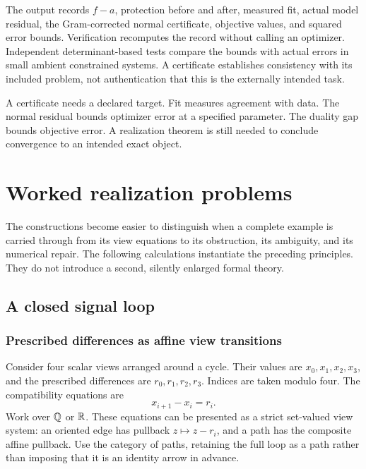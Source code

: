 The output records $f-a$, protection before and after, measured fit, actual model residual, the Gram-corrected normal certificate, objective values, and squared error bounds. Verification recomputes the record without calling an optimizer. Independent determinant-based tests compare the bounds with actual errors in small ambient constrained systems. A certificate establishes consistency with its included problem, not authentication that this is the externally intended task.

\begin{insight}
A certificate needs a declared target. Fit measures agreement with data. The normal residual bounds optimizer error at a specified parameter. The duality gap bounds objective error. A realization theorem is still needed to conclude convergence to an intended exact object.
\end{insight}




\chapter{Worked realization problems}\label{KS:book:chapter-24}
The constructions become easier to distinguish when a complete example is carried through from its view equations to its obstruction, its ambiguity, and its numerical repair. The following calculations instantiate the preceding principles. They do not introduce a second, silently enlarged formal theory.

\section{A closed signal loop}\label{KS:sec:signal-loop}
\subsection{Prescribed differences as affine view transitions}
Consider four scalar views arranged around a cycle. Their values are \(x_0,x_1,x_2,x_3\), and the prescribed differences are \(r_0,r_1,r_2,r_3\). Indices are taken modulo four. The compatibility equations are
\begin{equation}\label{KS:eq:cycle-difference}
 x_{i+1}-x_i=r_i.
\end{equation}
Work over \(\mathbb Q\) or \(\mathbb R\). These equations can be presented as a strict set-valued view system: an oriented edge has pullback \(z\mapsto z-r_i\), and a path has the composite affine pullback. Use the category of paths, retaining the full loop as a path rather than imposing that it is an identity arrow in advance.

